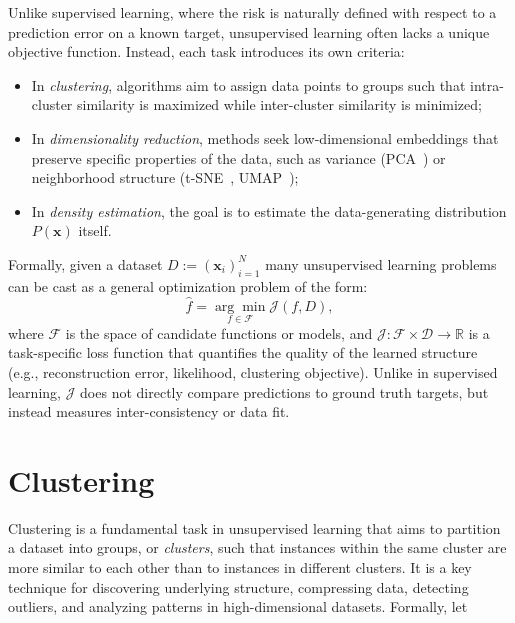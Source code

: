 Unlike supervised learning, where the risk is naturally defined with respect to
a prediction error on a known target, unsupervised learning often lacks a
unique objective function. Instead, each task introduces its own criteria:
\begin{itemize}
    \item In \emph{clustering}, algorithms aim to assign data points to groups such that
          intra-cluster similarity is maximized while inter-cluster similarity is
          minimized;
    \item In \emph{dimensionality reduction}, methods seek low-dimensional embeddings
          that preserve specific properties of the data, such as variance
          (PCA~\cite{pca}) or neighborhood structure (t-SNE~\cite{tsne},
          UMAP~\cite{umap});
    \item In \emph{density estimation}, the goal is to estimate the data-generating
          distribution $P(\mathbf{x})$ itself.
\end{itemize}

Formally, given a dataset $D:= (\mathbf{x}_i)_{i=1}^N$ many unsupervised
learning problems can be cast as a general optimization problem of the form:
\begin{equation}
    \hat{f} = \underset{f \in \mathcal{F}}{\arg\min} \mathcal{J}(f, D),
\end{equation}
where $\mathcal{F}$ is the space of candidate functions or models, and
$\mathcal{J}: \mathcal{F} \times \mathcal{D} \rightarrow \mathbb{R}$ is a task-specific loss function that quantifies the quality of
the learned structure (e.g., reconstruction error, likelihood, clustering
objective). Unlike in supervised learning, $\mathcal{J}$ does not directly
compare predictions to ground truth targets, but instead measures
inter-consistency or data fit.

\section{Clustering}\label{sec:clustering}

Clustering is a fundamental task in unsupervised learning that aims to
partition a dataset into groups, or \emph{clusters}, such that instances within
the same cluster are more similar to each other than to instances in different
clusters. It is a key technique for discovering underlying structure,
compressing data, detecting outliers, and analyzing patterns in
high-dimensional datasets. Formally, let

